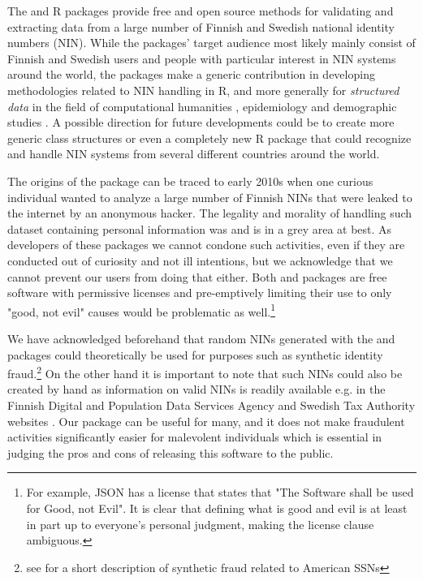 The  and  R packages provide free and open source methods for validating and extracting data from a large number of Finnish and Swedish national identity numbers (NIN). While the packages' target audience most likely mainly consist of Finnish and Swedish users and people with particular interest in NIN systems around the world, the packages make a generic contribution in developing methodologies related to NIN handling in R, and more generally for {\it structured data} in the field of computational humanities \citep[see][]{makela2020}, epidemiology and demographic studies \citep[see][]{gissler2004}. A possible direction for future developments could be to create more generic class structures or even a completely new R package that could recognize and handle NIN systems from several different countries around the world.

The origins of the  package can be traced to early 2010s when one curious individual wanted to analyze a large number of Finnish NINs that were leaked to the internet by an anonymous hacker. The legality and morality of handling such dataset containing personal information was and is in a grey area at best. As developers of these packages we cannot condone such activities, even if they are conducted out of curiosity and not ill intentions, but we acknowledge that we cannot prevent our users from doing that either. Both  and  packages are free software with permissive licenses and pre-emptively limiting their use to only "good, not evil" causes would be problematic as well.\footnote{For example, JSON has a license that states that "The Software shall be used for Good, not Evil". It is clear that defining what is good and evil is at least in part up to everyone's personal judgment, making the license clause ambiguous.}

We have acknowledged beforehand that random NINs generated with the  and  packages could theoretically be used for purposes such as synthetic identity fraud.\footnote{see \citet[32]{brensinger2021} for a short description of synthetic fraud related to American SSNs} On the other hand it is important to note that such NINs could also be created by hand as information on valid NINs is readily available e.g. in the Finnish Digital and Population Data Services Agency and Swedish Tax Authority websites \citep{hetudvv, sv2007}. Our package can be useful for many, and it does not make fraudulent activities significantly easier for malevolent individuals which is essential in judging the pros and cons of releasing this software to the public.

